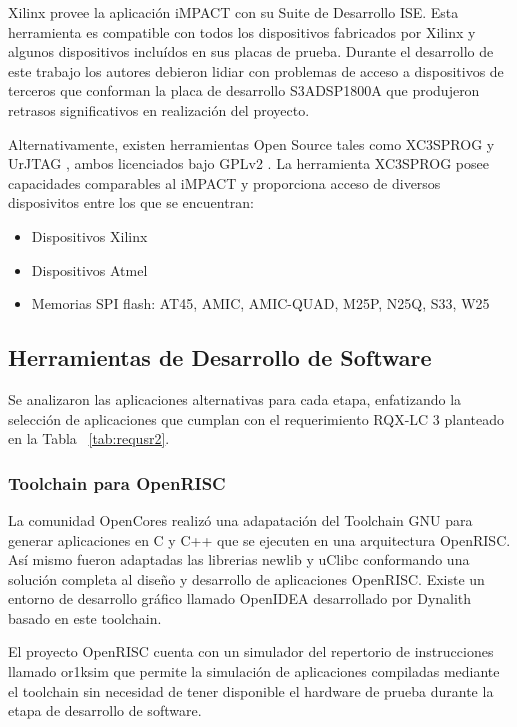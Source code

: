 				Xilinx provee la aplicación iMPACT con su Suite de Desarrollo ISE. Esta herramienta es compatible con todos los dispositivos fabricados por
				Xilinx y algunos dispositivos incluídos en sus placas de prueba. Durante el desarrollo de este trabajo los autores debieron lidiar con
				problemas de acceso a dispositivos de terceros que conforman la placa de desarrollo S3ADSP1800A que produjeron retrasos significativos en
				realización del proyecto.
 				
 				Alternativamente, existen herramientas Open Source tales como XC3SPROG y UrJTAG , ambos licenciados bajo GPLv2 . La herramienta XC3SPROG
 				posee capacidades comparables al iMPACT y proporciona acceso de diversos disposivitos entre los que se encuentran:
 				\begin{itemize}
 				  \item Dispositivos Xilinx
				  \item Dispositivos Atmel 
				  \item Memorias SPI flash: AT45, AMIC, AMIC-QUAD, M25P, N25Q, S33, W25
 				\end{itemize}
 				 
 				\subsection {Herramientas de Desarrollo de Software}
 			
				Se analizaron las aplicaciones alternativas para cada etapa, enfatizando la selección de aplicaciones que cumplan con el requerimiento RQX-LC 3
				planteado en la Tabla ~\ref{tab:requsr2}.   
				 			
 				\subsubsection {Toolchain para OpenRISC}
 				La comunidad OpenCores realizó una adapatación del Toolchain GNU para generar aplicaciones en C y C++ que se ejecuten en una arquitectura
 				OpenRISC. Así mismo fueron adaptadas las librerias newlib y uClibc conformando una solución completa al diseño y desarrollo de aplicaciones
 				OpenRISC. Existe un entorno de desarrollo gráfico llamado OpenIDEA desarrollado por Dynalith basado en este toolchain. 
				
				El proyecto OpenRISC cuenta con un simulador del repertorio de instrucciones llamado or1ksim que permite la simulación de aplicaciones compiladas
				mediante el toolchain sin necesidad de tener disponible el hardware de prueba durante la etapa de desarrollo de software.
 				
